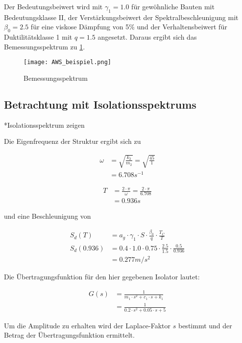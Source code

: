 Der Bedeutungsbeiwert wird mit $\gamma_1 = 1.0$ für gewöhnliche Bauten mit Bedeutungsklasse II, der Verstärkungsbeiwert der Spektralbeschleunigung mit $\beta_0 = 2.5$ für eine viskose Dämpfung von 5\% und der Verhaltensbeiwert für Duktilitätsklasse 1 mit $q = 1.5$ angesetzt.
Daraus ergibt sich das Bemessungsspektrum zu \cref{fig:Bemessungsspektrum}.

\begin{figure}[ht] 
    \centering
    \texttt{[image: AWS\_beispiel.png]}
    \caption{Bemessungsspektrum}
    \label{fig:Bemessungsspektrum}
\end{figure}

\subsection{Betrachtung mit Isolationsspektrums}

*Isolationsspektrum zeigen

Die Eigenfrequenz der Struktur ergibt sich zu

\begin{align*}
\omega &= \sqrt{\frac{k_2}{m_2}} = \sqrt{\frac{45}{1}}\\
       &= 6.708 s^{-1}
\end{align*}

\begin{align*}
T &= \frac{2 \cdot \pi}{\omega} = \frac{2 \cdot \pi}{6.708}\\
  &= 0.936 s
\end{align*}

und eine Beschleunigung von

\begin{align*}
S_d(T) &= a_g \cdot \gamma_1 \cdot S \cdot \frac{\beta_0}{q} \cdot \frac{T_C}{T}\\
S_d(0.936) &= 0.4 \cdot 1.0 \cdot 0.75 \cdot \frac{2.5}{1.5} \cdot \frac{0.5}{0.936}\\
           &= 0.277 m/s^2
\end{align*}

Die Übertragungsfunktion für den hier gegebenen Isolator lautet:

\begin{align*}
G(s) &= \frac{1}{m_1 \cdot s^2 + c_1 \cdot s + k_1}\\
     &= \frac{1}{0.2 \cdot s^2 + 0.05 \cdot s + 5}
\end{align*}

Um die Amplitude zu erhalten wird der Laplace-Faktor $s$ bestimmt und der Betrag der Übertragungsfunktion ermittelt.

